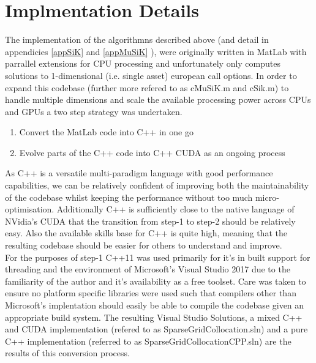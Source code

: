 \documentclass[a4paper]{amsart}
\begin{document}
\section{Implmentation Details}
The implementation of the algorithmns described above (and detail in appendicies \ref{appSiK} and \ref{appMuSiK} ), were originally written in MatLab with parrallel extensions for CPU processing and unfortunately only computes solutions to 1-dimensional (i.e. single asset) european call options. In order to expand this codebase (further more refered to as cMuSiK.m and cSik.m) to handle multiple dimensions and scale the available processing power across CPUs and GPUs a two step strategy was undertaken.\\

\renewcommand{\labelenumi}{\arabic{enumi}}
\begin{enumerate}
\item Convert the MatLab code into C++ in one go
\item Evolve parts of the C++ code into C++ CUDA as an ongoing process
\end{enumerate}

As C++ is a versatile multi-paradigm language with good performance capabilities, we can be relatively confident of improving both the maintainability of the codebase whilst keeping the performance without too much micro-optimisation. Additionally C++ is sufficiently close to the native language of NVidia's CUDA that the transition from step-1 to step-2 should be relatively easy. Also the available skills base for C++ is quite high, meaning that the resulting codebase should be easier for others to understand and improve.\\

For the purposes of step-1 C++11 was used primarily for it's in built support for threading and the environment of Microsoft's Visual Studio 2017 due to the familiarity of the author and it's availability as a free toolset. Care was taken to ensure no platform specific libraries were used such that compilers other than Microsoft's implentation should easily be able to compile the codebase given an appropriate build system. The resulting Visual Studio Solutions, a mixed C++ and CUDA implementation (refered to as SparseGridCollocation.sln) and a pure C++ implementation (referred to as SparseGridCollocationCPP.sln) are the results of this conversion process.\\
\end{document}
